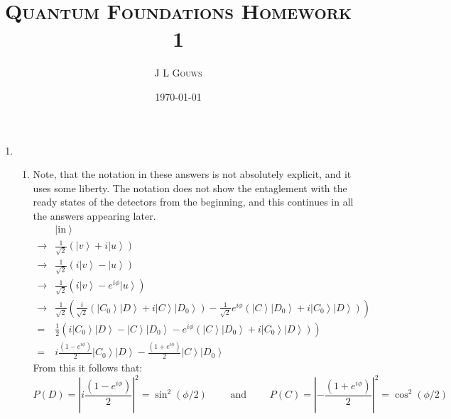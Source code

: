 \documentclass[12pt,a4]{article}
\title{
\textsc{Quantum Foundations Homework 1}
}
\author{\textsc{J L Gouws}
}
\date{\today
\\[1cm]}
\begin{document}
\thispagestyle{empty}

\maketitle

\begin{enumerate}
  \item
    \begin{enumerate}
      \item
        Note, that the notation in these answers is not absolutely explicit, and it uses some liberty.
        The notation does not show the entaglement with the ready states of the detectors from the beginning, and this continues in all the answers appearing later.
        \begin{align*}
              & \left| \text{in} \right\rangle \\
          \to & \frac{1}{\sqrt{2}} \left(\left| v \right \rangle + i \left| u \right \rangle \right) \\
          \to & \frac{1}{\sqrt{2}} \left(i\left| v \right \rangle - \left| u \right \rangle \right) \\
          \to & \frac{1}{\sqrt{2}} \left(i\left| v \right \rangle - e^{i \phi}\left| u \right \rangle \right) \\
          \to & \frac{1}{\sqrt{2}} \left(\frac{i}{\sqrt{2}}\left(\left| C_0 \right \rangle \left| D \right \rangle + i \left| C \right \rangle \left| D_0 \right \rangle\right) - \frac{1}{\sqrt{2}} e^{i \phi}\left( \left| C \right \rangle\left| D_0 \right \rangle + i\left| C_0 \right \rangle \left| D \right \rangle \right) \right) \\
            = & \frac{1}{2} \left( i \left| C_0 \right \rangle \left| D \right \rangle - \left| C \right \rangle \left| D_0 \right \rangle - e^{i \phi} \left( \left| C \right \rangle \left| D_0 \right \rangle + i \left| C_0 \right \rangle \left| D \right \rangle \right) \right) \\
            = & i \frac{(1 - e^{i \phi})}{2} \left| C_0 \right \rangle \left| D \right \rangle - \frac{(1 + e^{i \phi})}{2} \left| C \right \rangle \left| D_0 \right \rangle  
        \end{align*}
        From this it follows that:
        \begin{equation*}
          P (D) = \left| i \frac{(1 - e^{i \phi})}{2} \right|^2 = \sin^2 (\phi / 2) \qquad \text{ and } \qquad  P (C) = \left| - \frac{(1 + e^{i \phi})}{2} \right|^2 = \cos^2 (\phi / 2)
        \end{equation*}

\end{enumerate}
\end{enumerate}
\end{document}

